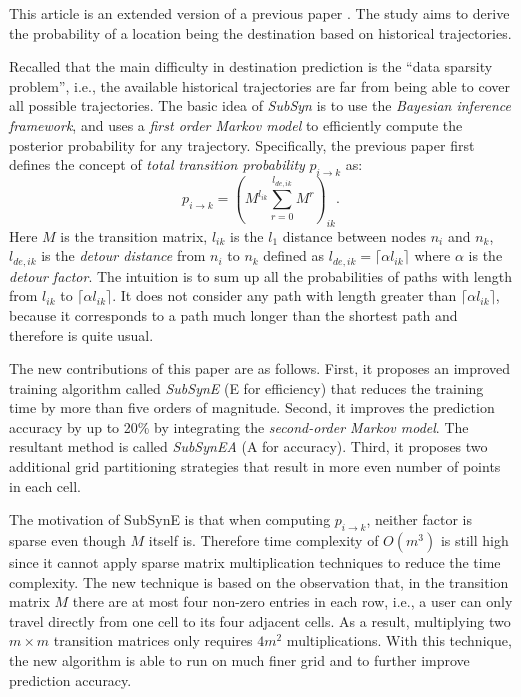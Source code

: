 \documentclass[paper=a4, fontsize=18pt]{article} %
\numberwithin{equation}{section} %
\numberwithin{figure}{section} %
\numberwithin{table}{section} %
\begin{document}
This article is an extended version of a previous paper \cite{XZZXHX13}. The study aims to derive the probability of a location being the destination based on historical trajectories.

Recalled that the main difficulty in destination prediction is the ``data sparsity problem'', i.e., the available historical trajectories are far from being able to cover all possible trajectories. The basic idea of \emph{SubSyn} is to use the \emph{Bayesian inference framework}, and uses a \emph{first order Markov model} to efficiently compute the posterior probability for any trajectory. Specifically, the previous paper first defines the concept of \emph{total transition probability} $p_{i \rightarrow k}$ as:
$$p_{i \rightarrow k} = (M^{l_{ik}}\sum_{r=0}^{l_{de,ik}} M^r)_{ik}.$$
Here $M$ is the transition matrix, $l_{ik}$ is the $l_1$ distance between nodes $n_i$ and $n_k$, $l_{de,ik}$ is the \emph{detour distance} from $n_i$ to $n_k$ defined as $l_{de, ik} =\lceil \alpha l_{ik} \rceil$ where $\alpha$ is the \emph{detour factor}. The intuition is to sum up all the probabilities of paths with length from $l_{ik}$ to $\lceil \alpha l_{ik} \rceil$. It does not consider any path with length greater than $\lceil \alpha l_{ik} \rceil$, because it corresponds to a path much longer than the shortest path and therefore is quite usual.

The new contributions of this paper are as follows. First, it proposes an improved training algorithm called \emph{SubSynE} (E for efficiency) that reduces the training time by more than five orders of magnitude. Second, it improves the prediction accuracy by up to 20\% by integrating the \emph{second-order Markov model}. The resultant method is called \emph{SubSynEA} (A for accuracy). Third, it proposes two additional grid partitioning strategies that result in more even number of points in each cell.

The motivation of SubSynE is that when computing $p_{i \rightarrow k}$, neither factor is sparse  even though $M$ itself is. Therefore time complexity of $O(m^3)$ is still high since it cannot apply sparse matrix multiplication techniques to reduce the time complexity. The new technique is based on the observation that, in the transition matrix $M$ there are at most four non-zero entries in each row, i.e., a user can only travel directly from one cell to its four adjacent cells. As a result, multiplying two $m \times m$ transition matrices only requires $4m^2$ multiplications. With this technique, the new algorithm is able to run on much finer grid and to further improve prediction accuracy.
\end{document}
